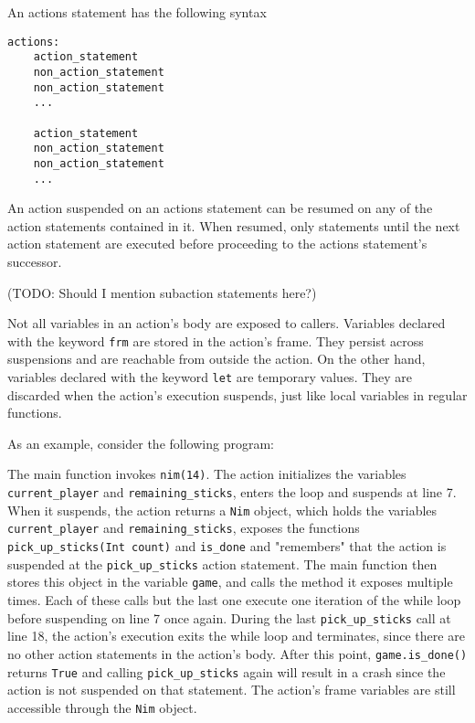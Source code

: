 An actions statement has the following syntax
\begin{lstlisting}
actions:
    action_statement
    non_action_statement
    non_action_statement
    ...

    action_statement
    non_action_statement
    non_action_statement
    ...
\end{lstlisting}
An action suspended on an actions statement can be resumed on any of the action statements contained in it.
When resumed, only statements until the next action statement are executed before proceeding to the actions statement's successor.

(TODO: Should I mention subaction statements here?)

Not all variables in an action's body are exposed to callers.
Variables declared with the keyword \texttt{frm} are stored in the action's frame.
They persist across suspensions and are reachable from outside the action.
On the other hand, variables declared with the keyword \texttt{let} are temporary values.
They are discarded when the action's execution suspends, just like local variables in regular functions.

As an example, consider the following program:



The main function invokes \texttt{nim(14)}.
The action initializes the variables \texttt{current\_player} and \texttt{remaining\_sticks}, enters the loop and suspends at line 7.
When it suspends, the action returns a \texttt{Nim} object, which holds the variables
 \texttt{current\_player} and \texttt{remaining\_sticks}, exposes the functions \texttt{pick\_up\_sticks(Int count)} and \texttt{is\_done\(\)} 
 and "remembers" that the action is suspended at the \texttt{pick\_up\_sticks} action statement.
The main function then stores this object in the variable \texttt{game}, and calls the method it exposes multiple times.
Each of these calls but the last one execute one iteration of the while loop before suspending on line 7 once again.
During the last \texttt{pick\_up\_sticks} call at line 18, the action's execution exits the while loop and terminates, since there are no other action statements in the action's body.
After this point, \texttt{game.is\_done()} returns \texttt{True} and calling \texttt{pick\_up\_sticks} again will result in a crash since the action is not suspended on that statement.
The action's frame variables are still accessible through the \texttt{Nim} object.


